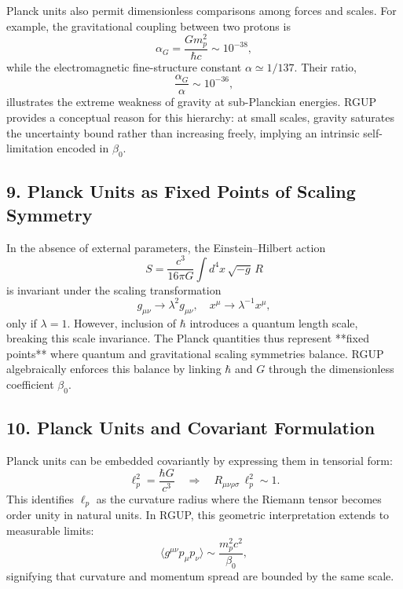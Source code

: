 \documentclass[11pt,oneside]{book}
\numberwithin{equation}{chapter}
\newcommand{\betaz}{\beta_0}
\begin{document}
Planck units also permit dimensionless comparisons among forces and scales.  
For example, the gravitational coupling between two protons is
\begin{equation}
\alpha_G = \frac{Gm_p^2}{\hbar c} \sim 10^{-38},
\end{equation}
while the electromagnetic fine-structure constant $\alpha \simeq 1/137$.  
Their ratio,
\begin{equation}
\frac{\alpha_G}{\alpha} \sim 10^{-36},
\end{equation}
illustrates the extreme weakness of gravity at sub-Planckian energies.  
RGUP provides a conceptual reason for this hierarchy: at small scales, gravity saturates the uncertainty bound rather than increasing freely, implying an intrinsic self-limitation encoded in $\betaz$.

\subsection*{9. Planck Units as Fixed Points of Scaling Symmetry}

In the absence of external parameters, the Einstein–Hilbert action
\begin{equation}
S = \frac{c^3}{16\pi G}\int d^4x\,\sqrt{-g}\,R
\end{equation}
is invariant under the scaling transformation
\begin{equation}
g_{\mu\nu} \rightarrow \lambda^2 g_{\mu\nu},
\quad
x^\mu \rightarrow \lambda^{-1}x^\mu,
\end{equation}
only if $\lambda = 1$.  
However, inclusion of $\hbar$ introduces a quantum length scale, breaking this scale invariance.  
The Planck quantities thus represent **fixed points** where quantum and gravitational scaling symmetries balance.  
RGUP algebraically enforces this balance by linking $\hbar$ and $G$ through the dimensionless coefficient $\betaz$.

\subsection*{10. Planck Units and Covariant Formulation}

Planck units can be embedded covariantly by expressing them in tensorial form:
\begin{equation}
\ell_p^2 = \frac{\hbar G}{c^3}
\quad \Rightarrow \quad
R_{\mu\nu\rho\sigma}\,\ell_p^2 \sim 1.
\end{equation}
This identifies $\ell_p$ as the curvature radius where the Riemann tensor becomes order unity in natural units.  
In RGUP, this geometric interpretation extends to measurable limits:
\begin{equation}
\langle g^{\mu\nu}p_\mu p_\nu \rangle
\sim
\frac{m_p^2 c^2}{\betaz},
\end{equation}
signifying that curvature and momentum spread are bounded by the same scale.  
\end{document}
